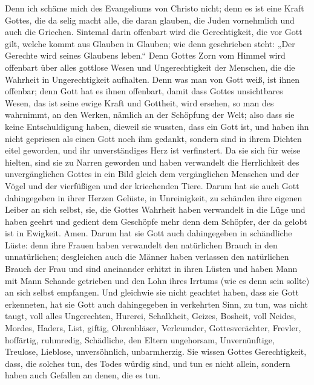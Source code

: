  Denn ich schäme mich des Evangeliums von Christo nicht;
denn es ist eine Kraft Gottes, die da selig macht alle, die daran
glauben, die Juden vornehmlich und auch die Griechen. 
Sintemal darin offenbart wird die Gerechtigkeit, die vor Gott gilt,
welche kommt aus Glauben in Glauben; wie denn geschrieben steht: „Der
Gerechte wird seines Glaubens leben.``  Denn Gottes Zorn
vom Himmel wird offenbart über alles gottlose Wesen und Ungerechtigkeit
der Menschen, die die Wahrheit in Ungerechtigkeit aufhalten.
 Denn was man von Gott weiß, ist ihnen offenbar; denn
Gott hat es ihnen offenbart,  damit dass Gottes
unsichtbares Wesen, das ist seine ewige Kraft und Gottheit, wird
ersehen, so man des wahrnimmt, an den Werken, nämlich an der Schöpfung
der Welt; also dass sie keine Entschuldigung haben, 
dieweil sie wussten, dass ein Gott ist, und haben ihn nicht gepriesen
als einen Gott noch ihm gedankt, sondern sind in ihrem Dichten eitel
geworden, und ihr unverständiges Herz ist verfinstert. 
Da sie sich für weise hielten, sind sie zu Narren geworden
 und haben verwandelt die Herrlichkeit des
unvergänglichen Gottes in ein Bild gleich dem vergänglichen Menschen und
der Vögel und der vierfüßigen und der kriechenden Tiere. 
Darum hat sie auch Gott dahingegeben in ihrer Herzen Gelüste, in
Unreinigkeit, zu schänden ihre eigenen Leiber an sich selbst,
 sie, die Gottes Wahrheit haben verwandelt in die Lüge
und haben geehrt und gedient dem Geschöpfe mehr denn dem Schöpfer, der
da gelobt ist in Ewigkeit. Amen.  Darum hat sie Gott auch
dahingegeben in schändliche Lüste: denn ihre Frauen haben verwandelt den
natürlichen Brauch in den unnatürlichen;  desgleichen
auch die Männer haben verlassen den natürlichen Brauch der Frau und sind
aneinander erhitzt in ihren Lüsten und haben Mann mit Mann Schande
getrieben und den Lohn ihres Irrtums (wie es denn sein sollte) an sich
selbst empfangen.  Und gleichwie sie nicht geachtet
haben, dass sie Gott erkenneten, hat sie Gott auch dahingegeben in
verkehrten Sinn, zu tun, was nicht taugt,  voll alles
Ungerechten, Hurerei, Schalkheit, Geizes, Bosheit, voll Neides, Mordes,
Haders, List, giftig, Ohrenbläser,  Verleumder,
Gottesverächter, Frevler, hoffärtig, ruhmredig, Schädliche, den Eltern
ungehorsam,  Unvernünftige, Treulose, Lieblose,
unversöhnlich, unbarmherzig.  Sie wissen Gottes
Gerechtigkeit, dass, die solches tun, des Todes würdig sind, und tun es
nicht allein, sondern haben auch Gefallen an denen, die es tun.

